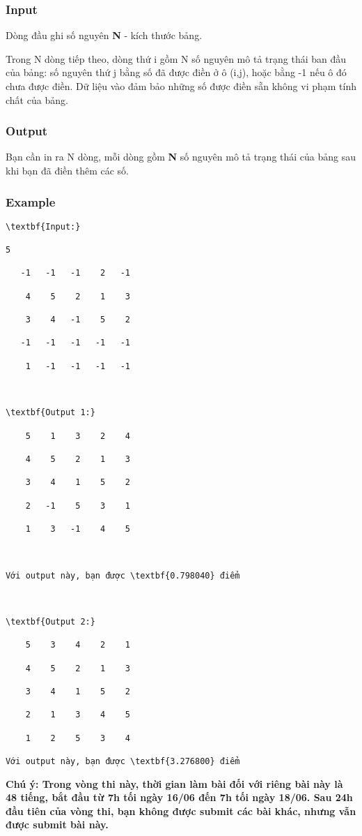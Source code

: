 \subsubsection{Input}

Dòng đầu ghi số nguyên \textbf{N} - kích thước bảng.

Trong N dòng tiếp theo, dòng thứ i gồm N số nguyên mô tả trạng thái ban đầu của bảng: số nguyên thứ j bằng số đã được điền ở ô (i,j), hoặc bằng -1 nếu ô đó chưa được điền. Dữ liệu vào đảm bảo những số được điền sẵn không vi phạm tính chất của bảng.

\subsubsection{Output}

Bạn cần in ra N dòng, mỗi dòng gồm \textbf{N} số nguyên mô tả trạng thái của bảng sau khi bạn đã điền thêm các số.

\subsubsection{Example}
\begin{verbatim}
\textbf{Input:}

5

   -1   -1   -1    2   -1

    4    5    2    1    3

    3    4   -1    5    2

   -1   -1   -1   -1   -1

    1   -1   -1   -1   -1



\textbf{Output 1:}

    5    1    3    2    4

    4    5    2    1    3

    3    4    1    5    2

    2   -1    5    3    1

    1    3   -1    4    5



Với output này, bạn được \textbf{0.798040} điểm



\textbf{Output 2:}

    5    3    4    2    1

    4    5    2    1    3

    3    4    1    5    2

    2    1    3    4    5

    1    2    5    3    4

Với output này, bạn được \textbf{3.276800} điểm

\end{verbatim}

\textbf{Chú ý: Trong vòng thi này, thời gian làm bài đối với riêng bài này là \textbf{48 tiếng}, bắt đầu từ 7h tối ngày 16/06 đến 7h tối ngày 18/06. Sau 24h đầu tiên của vòng thi, bạn không được submit các bài khác, nhưng vẫn được submit bài này. }
